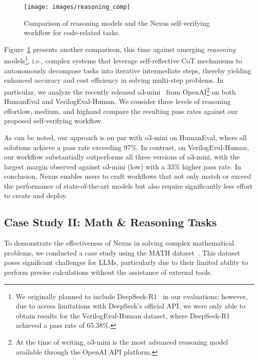 \begin{figure}[h]
    \centering
    \texttt{[image: images/reasoning\_comp]}
    \caption{Comparison of reasoning models and the Nexus self-verifying workflow for code-related tasks.}
    \label{fig:reasoning_comp}
\end{figure}

Figure~\ref{fig:reasoning_comp} presents another comparison, this time against emerging {\em reasoning} models\footnote{We originally planned to include DeepSeek-R1~\cite{guo2025deepseek} in our evaluations; however, due to access limitations with DeepSeek's official API, we were only able to obtain results for the VerilogEval-Human dataset, where DeepSeek-R1 achieved a pass rate of 65.38\%.}, i.e., complex systems that leverage self-reflective CoT mechanisms to autonomously decompose tasks into iterative intermediate steps, thereby yielding enhanced accuracy and cost efficiency in solving multi-step problems. In particular, we analyze the recently released o3-mini~\cite{o3mini} from OpenAI\footnote{At the time of writing, o3-mini is the most advanced reasoning model available through the OpenAI API platform.} on both HumanEval and VerilogEval-Human. We consider three levels of reasoning effort\textemdash low, medium, and high\textemdash and compare the resulting pass rates against our proposed self-verifying workflow.

As can be noted, our approach is on par with o3-mini on HumanEval, where all solutions achieve a pass rate exceeding 97\%. In contrast, on VerilogEval-Human, our workflow substantially outperforms all three versions of o3-mini, with the largest margin observed against o3-mini (low) with a 33\% higher pass rate. In conclusion, Nexus enables users to craft workflows that not only match or exceed the performance of state-of-the-art models but also require significantly less effort to create and deploy.

\subsection{Case Study II: Math \& Reasoning Tasks}

To demonstrate the effectiveness of Nexus in solving complex mathematical problems, we conducted a case study using the MATH dataset~\cite{hendrycks2021measuring}. This dataset poses significant challenges for LLMs, particularly due to their limited ability to perform precise calculations without the assistance of external tools.

